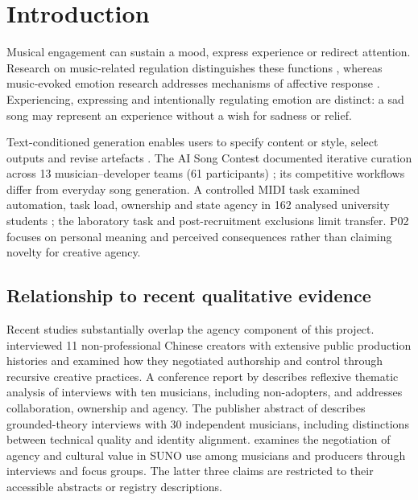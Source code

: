 \section{Introduction}
Musical engagement can sustain a mood, express experience or redirect attention. Research on music-related regulation distinguishes these functions \citep{saarikallio2007,baltazar2016,baltazar2019}, whereas music-evoked emotion research addresses mechanisms of affective response \citep{juslin2008}. Experiencing, expressing and intentionally regulating emotion are distinct: a sad song may represent an experience without a wish for sadness or relief.

Text-conditioned generation enables users to specify content or style, select outputs and revise artefacts \citep{copet2023}. The AI Song Contest documented iterative curation across 13 musician--developer teams (61 participants) \citep{huang2020}; its competitive workflows differ from everyday song generation. A controlled MIDI task examined automation, task load, ownership and state agency in 162 analysed university students \citep{he2026}; the laboratory task and post-recruitment exclusions limit transfer. P02 focuses on personal meaning and perceived consequences rather than claiming novelty for creative agency.

\subsection{Relationship to recent qualitative evidence}
Recent studies substantially overlap the agency component of this project. \citet{zhao2026} interviewed 11 non-professional Chinese creators with extensive public production histories and examined how they negotiated authorship and control through recursive creative practices. A conference report by \citet{peachey2026} describes reflexive thematic analysis of interviews with ten musicians, including non-adopters, and addresses collaboration, ownership and agency. The publisher abstract of \citet{wang2026} describes grounded-theory interviews with 30 independent musicians, including distinctions between technical quality and identity alignment. \citet{raffa2025} examines the negotiation of agency and cultural value in SUNO use among musicians and producers through interviews and focus groups. The latter three claims are restricted to their accessible abstracts or registry descriptions.

